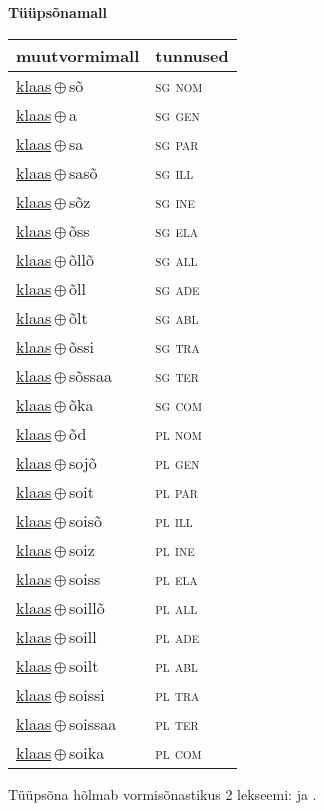 

\vspace{3.5em}
\noindent \begin{minipage}{\textwidth}
\noindent \textbf{Tüüpsõnamall \,}\\

\begin{sideways}
\begin{tabular}{l l}
muutvormimall & tunnused \\
\hline
\underline{klaas}\,$\oplus$\,sõ & \textsc{ sg nom } \\
\underline{klaas}\,$\oplus$\,a & \textsc{ sg gen } \\
\underline{klaas}\,$\oplus$\,sa & \textsc{ sg par } \\
\underline{klaas}\,$\oplus$\,sasõ & \textsc{ sg ill } \\
\underline{klaas}\,$\oplus$\,sõz & \textsc{ sg ine } \\
\underline{klaas}\,$\oplus$\,õss & \textsc{ sg ela } \\
\underline{klaas}\,$\oplus$\,õllõ & \textsc{ sg all } \\
\underline{klaas}\,$\oplus$\,õll & \textsc{ sg ade } \\
\underline{klaas}\,$\oplus$\,õlt & \textsc{ sg abl } \\
\underline{klaas}\,$\oplus$\,õssi & \textsc{ sg tra } \\
\underline{klaas}\,$\oplus$\,sõssaa & \textsc{ sg ter } \\
\underline{klaas}\,$\oplus$\,õka & \textsc{ sg com } \\
\underline{klaas}\,$\oplus$\,õd & \textsc{ pl nom } \\
\underline{klaas}\,$\oplus$\,sojõ & \textsc{ pl gen } \\
\underline{klaas}\,$\oplus$\,soit & \textsc{ pl par } \\
\underline{klaas}\,$\oplus$\,soisõ & \textsc{ pl ill } \\
\underline{klaas}\,$\oplus$\,soiz & \textsc{ pl ine } \\
\underline{klaas}\,$\oplus$\,soiss & \textsc{ pl ela } \\
\underline{klaas}\,$\oplus$\,soillõ & \textsc{ pl all } \\
\underline{klaas}\,$\oplus$\,soill & \textsc{ pl ade } \\
\underline{klaas}\,$\oplus$\,soilt & \textsc{ pl abl } \\
\underline{klaas}\,$\oplus$\,soissi & \textsc{ pl tra } \\
\underline{klaas}\,$\oplus$\,soissaa & \textsc{ pl ter } \\
\underline{klaas}\,$\oplus$\,soika & \textsc{ pl com } \\
\end{tabular}
\end{sideways}
\label{tab:tüüpsõnamall-klaassõ}

\end{minipage}

 
\vspace{1em}
\noindent Tüüpsõna hõlmab vormisõnastikus 2 lekseemi:  ja .
